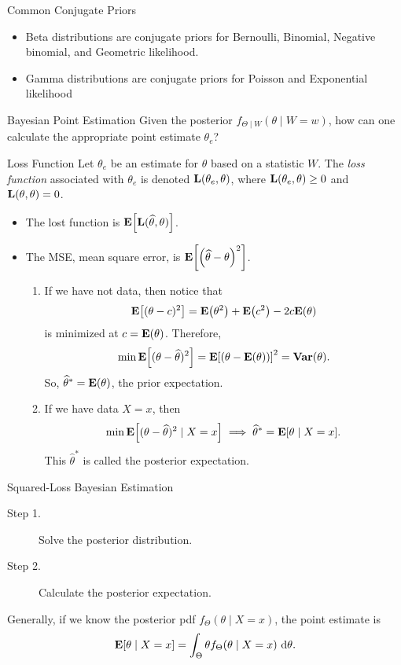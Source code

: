 \begin{rmk}
	Common Conjugate Priors
	\begin{itemize}
		\item Beta distributions are conjugate priors for Bernoulli, Binomial, Negative binomial, and Geometric likelihood.
		\item Gamma distributions are conjugate priors for Poisson and Exponential likelihood
	\end{itemize}	
\end{rmk}
\begin{df}{Bayesian Point Estimation}
	Given the posterior $f_{\Theta\mid W}(\theta\mid W=w)$, how can one calculate the appropriate point estimate $\theta_e$?
\end{df}
\begin{df}{Loss Function}
	Let $\theta_e$ be an estimate for $\theta$ based on a statistic $W$. The \textit{loss function} associated with $\theta_e$ is denoted $\vb{L}(\theta_e,\theta)$, where $\vb{L}(\theta_e,\theta)\geq0$ and $\vb{L}(\theta,\theta)=0$.	
\end{df}
\begin{itemize}
	\item The lost function is $\vb{E}\qty[\vb{L}(\widehat\theta,\theta)]$.
	\item The MSE, mean square error, is $\vb{E}\qty[\qty(\widehat\theta-\theta)^2]$.
	\begin{enumerate}
		\item If we have not data, then notice that \[\vb{E}\qty[(\theta-c)^2]=\vb{E}\qty(\theta^2)+\vb{E}\qty(c^2)-2c\vb{E}(\theta)\] is minimized at $c=\vb{E}(\theta)$. Therefore, \[\min\vb{E}\qty[(\theta-\widehat\theta)^2]=\vb{E}\qty[(\theta-\vb{E}(\theta))]^2=\vb{Var}(\theta).\] So, $\widehat\theta^*=\vb{E}(\theta)$, the prior expectation.
		\item If we have data $X=x$, then \[\min\vb{E}\qty[(\theta-\widehat\theta)^2\mid X=x]\implies\widehat\theta^*=\vb{E}\qty[\theta\mid X=x].\] This $\hat\theta^*$ is called the posterior expectation. 
	\end{enumerate}
\end{itemize}
\begin{thm}{Squared-Loss Bayesian Estimation}
	\begin{description}
		\item[Step 1.] Solve the posterior distribution.
		\item[Step 2.] Calculate the posterior expectation. 
	\end{description}
	Generally, if we know the posterior pdf $f_\Theta(\theta\mid X=x)$, the point estimate is \[\E[\theta\mid X=x]=\int_\Theta\theta f_\Theta(\theta\mid X=x)\ \d{\theta}.\]
\end{thm}
